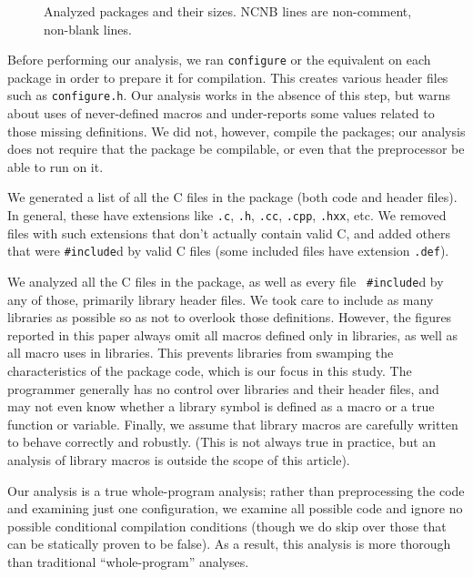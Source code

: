\documentclass[10pt]{article}
\def\typeofdocument{article}
\newcommand{\file}[1]{\texttt{#1}}
\newcommand{\captionsmall}[1]{\caption[]{\small #1}}
\begin{document}
\begin{figure}
\centering
{%
  \small
  \setlength{\tabcolsep}{.25em}
  
}
\captionsmall{Analyzed packages and their sizes.  NCNB lines are non-comment,
  non-blank lines.}
\label{fig:packages}
\end{figure}

Before performing our analysis, we ran {\tt configure} or the equivalent on
each package in order to prepare it for compilation.  This creates various
header files such as \file{configure.h}.  Our analysis works in the
absence of this step, but warns about uses of never-defined macros and
under-reports some values related to those missing definitions.  We did
not, however, compile the packages; our analysis does not require that the
package be compilable, or even that the preprocessor be able to run on it.

We generated a list of all the C files in the package (both code and header
files).  In general, these have extensions like \file{.c}, \file{.h},
\file{.cc}, \file{.cpp}, \file{.hxx}, etc.  We removed files with such
extensions that don't actually contain valid C, and added others that were
{\tt \#include}d by valid C files (some included files have extension
\file{.def}).

We analyzed all the C files in the package, as well as every file {\tt
\#include}d by any of those, primarily library header files.  We
took care to include as many libraries as possible so as not to overlook
those definitions.  However, the figures reported in this paper always omit
all macros defined only in libraries, as well as all macro uses in
libraries.  This prevents libraries from swamping the characteristics of
the package code, which is our focus in this study.  The programmer
generally has no control over libraries and their header files, and may not
even know whether a library symbol is defined as a macro or a true function
or variable.  Finally, we assume that library macros are carefully written
to behave correctly and robustly.  (This is not always true in practice,
but an analysis of library macros is outside the scope of this
\typeofdocument).

Our analysis is a true whole-program analysis; rather than preprocessing the
code and examining just one configuration, we examine all possible code and
ignore no possible  conditional compilation conditions (though we do skip
over those that can be statically proven to be false).   As a result, this
analysis is more thorough than traditional ``whole-program'' analyses.
\end{document}
